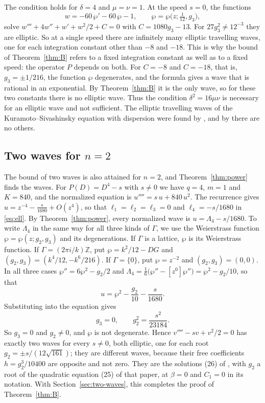 \documentclass[11pt]{article}
\theoremstyle{definition}
\theoremstyle{remark}
\numberwithin{equation}{section}
\newcommand{\ZZ}{\mathbb Z}
\begin{document}
The condition holds for \(\delta=4\) and \(\mu=\nu=1\). At the speed
\(s=0\), the functions
\[
 w=-60\,\wp'-60\,\wp-1,\qquad \wp=\wp\bigl(z;\tfrac1{12},g_3\bigr),
\]
solve \(w'''+4w''+w'+w^2/2+C=0\) with \(C=1080g_3-13\). For
\(27g_3^2\ne12^{-3}\) they are elliptic. So at a single speed there
are infinitely many elliptic travelling waves,
one for each integration constant other than \(-8\) and \(-18\). This
is why the bound of Theorem~\ref{thm:B} refers to a fixed integration
constant as well as to a fixed speed: the operator \(P\) depends on
both. For \(C=-8\) and \(C=-18\), that is, \(g_3=\pm1/216\), the
function \(\wp\) degenerates, and the formula gives a wave that is
rational in an exponential. By Theorem~\ref{thm:B} it is the only
wave, so for these two constants there is no elliptic wave. Thus the
condition \(\delta^2=16\mu\nu\) is necessary for an elliptic wave and
not sufficient. The elliptic travelling waves of the
Kuramoto--Sivashinsky equation with dispersion were found by
\citet{Kudryashov1990}, and by \citet{Eremenko2006} there are no others.

\subsection{\texorpdfstring{Two waves for \(n=2\)}{Two waves for n = 2}}\label{sec:n2}

The bound of two waves is also attained for \(n=2\), and
Theorem~\ref{thm:power} finds the waves. For
\(P(D)=D^4-s\) with \(s\ne0\) we have \(q=4\), \(m=1\) and
\(K=840\), and the normalized equation is \(u''''=s\,u+840\,u^2\). The
recurrence gives \(u=z^{-4}-\tfrac{s}{1680}+O(z^{4})\), so that
\(\ell_1=\ell_2=\ell_3=0\) and \(\ell_4=-s/1680\) in \eqref{eq:ell}. By
Theorem~\ref{thm:power}, every normalized wave is
\(u=\Lambda_4-s/1680\). To write \(\Lambda_4\) in the same way for
all three kinds of \(\Gamma\), we use the Weierstrass function
\(\wp=\wp(z;g_2,g_3)\) and its degenerations. If \(\Gamma\) is a
lattice, \(\wp\) is its Weierstrass function. If
\(\Gamma=(2\pi i/k)\ZZ\), put \(\wp=k^2/12-DG\) and
\((g_2,g_3)=(k^4/12,-k^6/216)\). If \(\Gamma=\{0\}\), put
\(\wp=z^{-2}\) and \((g_2,g_3)=(0,0)\). In all three cases
\(\wp''=6\wp^2-g_2/2\) and
\(\Lambda_4=\tfrac16\bigl(\wp''-[z^0]\wp''\bigr)=\wp^2-g_2/10\), so
that
\[
 u=\wp^2-\frac{g_2}{10}-\frac{s}{1680}.
\]
Substituting into the equation gives
\[
 g_3=0,\qquad g_2^2=\frac{s^2}{23184}.
\]
So \(g_3=0\) and \(g_2\ne0\), and \(\wp\) is not degenerate. Hence \(v''''-sv+v^2/2=0\) has exactly two waves for every
\(s\ne0\), both elliptic, one for each root
\(g_2=\pm s/(12\sqrt{161})\); they are different waves, because their
free coefficients \(h=g_2^3/10400\) are opposite and not zero. They are the
solutions (26) of \citet{DeminaKudryashovKawahara2010}, with \(g_2\) a
root of the quadratic equation (25) of that paper, at \(\beta=0\) and
\(C_1=0\) in its notation. With Section~\ref{sec:two-waves}, this
completes the proof of Theorem~\ref{thm:B}.
\end{document}
